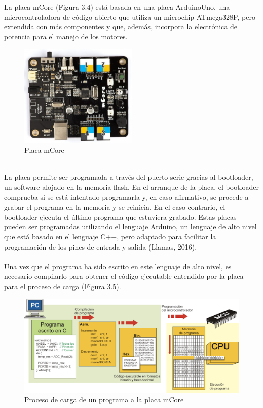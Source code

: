 \documentclass{report}
\begin{document}
La placa mCore (Figura 3.4) está basada en una placa ArduinoUno, una microcontroladora de código abierto que utiliza un microchip ATmega328P, pero extendida con más componentes y que, además, incorpora la electrónica de potencia para el manejo de los motores.
\\
\begin{figure}[h!]
  \centering
    \includegraphics[width=0.5\textwidth]{images/mcore.png}
  \caption{Placa mCore}
  \label{Placa mCore}
\end{figure}
\\
La placa permite ser programada a través del puerto serie gracias al bootloader, un software alojado en la memoria flash. En el arranque de la placa, el bootloader comprueba si se está intentado programarla y, en caso afirmativo, se procede a grabar el programa en la memoria y se reinicia. En el caso contrario, el bootloader ejecuta el último programa que estuviera grabado. Estas placas pueden ser programadas utilizando el lenguaje Arduino, un lenguaje de alto nivel que está basado en el lenguaje C++, pero adaptado para facilitar la programación de los pines de entrada y salida (Llamas, 2016).
\\
\\
Una vez que el programa ha sido escrito en este lenguaje de alto nivel, es necesario compilarlo para obtener el código ejecutable entendido por la placa para el proceso de carga (Figura 3.5).
\\
\begin{figure}[h!]
  \centering
    \includegraphics[width=1\textwidth]{images/carga_mcore.png}
  \caption{Proceso de carga de un programa a la placa mCore}
  \label{Proceso de carga de un programa a la placa mCore}
\end{figure}
\end{document}
